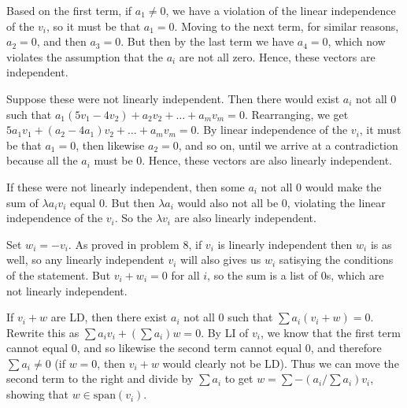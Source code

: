 \documentclass{article}
\begin{document}
Based on the first term, if $a_1 \neq 0$, we have a violation of the linear
independence of the $v_i$, so it must be that $a_1 = 0$. Moving to the next
term, for similar reasons, $a_2 = 0$, and then $a_3 = 0$. But then by the last
term we have $a_4 = 0$, which now violates the assumption that the $a_i$ are not
all zero. Hence, these vectors are independent.


Suppose these were not linearly independent. Then there would exist $a_i$ not
all 0 such that $a_1(5v_1 - 4v_2) + a_2v_2 + \ldots + a_mv_m = 0$. Rearranging,
we get $5a_1v_1 + (a_2 - 4a_1)v_2 + \ldots + a_mv_m = 0$. By linear independence
of the $v_i$, it must be that $a_1 = 0$, then likewise $a_2 = 0$, and so on,
until we arrive at a contradiction because all the $a_i$ must be 0. Hence, these
vectors are also linearly independent.


If these were not linearly independent, then some $a_i$ not all 0 would make
the sum of $\lambda a_iv_i$ equal 0. But then $\lambda a_i$ would also not all
be 0, violating the linear independence of the $v_i$. So the $\lambda v_i$ are
also linearly independent.


Set $w_i = -v_i$. As proved in problem 8, if $v_i$ is linearly independent then
$w_i$ is as well, so any linearly independent $v_i$ will also gives us $w_i$
satisying the conditions of the statement. But $v_i + w_i = 0$ for all $i$, so
the sum is a list of 0s, which are not linearly independent.


If $v_i + w$ are LD, then there exist $a_i$ not all 0 such that $\sum a_i(v_i +
w) = 0$. Rewrite this as $\sum a_iv_i + (\sum a_i)w = 0$. By LI of $v_i$, we
know that the first term cannot equal 0, and so likewise the second term cannot
equal 0, and therefore $\sum a_i \neq 0$ (if $w = 0$, then $v_i + w$ would
clearly not be LD). Thus we can move the second term to the right and divide by
$\sum a_i$ to get $w = \sum -(a_i / \sum a_i) v_i$, showing that $w \in
\text{span}(v_i)$.
\end{document}
